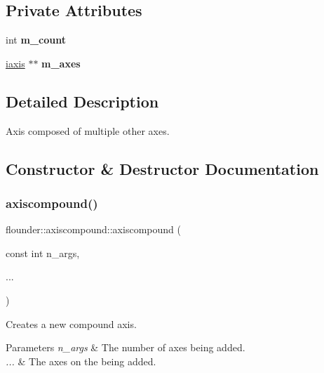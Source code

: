 \subsection*{Private Attributes}
\begin{DoxyCompactItemize}
\item 
\mbox{\label{classflounder_1_1axiscompound_ab876ccafbfabb22aac47b09ce4917b0c}} 
int {\bfseries m\+\_\+count}
\item 
\mbox{\label{classflounder_1_1axiscompound_a5bbc0ced9b75906a09ecfc327db4b42a}} 
\hyperlink{classflounder_1_1iaxis}{iaxis} $\ast$$\ast$ {\bfseries m\+\_\+axes}
\end{DoxyCompactItemize}


\subsection{Detailed Description}
Axis composed of multiple other axes. 



\subsection{Constructor \& Destructor Documentation}
\mbox{\label{classflounder_1_1axiscompound_a5f1704b50b966bca51730f7fecfc3728}} 
\subsubsection{\texorpdfstring{axiscompound()}{axiscompound()}}
{\footnotesize\ttfamily flounder\+::axiscompound\+::axiscompound (\begin{DoxyParamCaption}\item[{const int}]{n\+\_\+args,  }\item[{}]{... }\end{DoxyParamCaption})}



Creates a new compound axis. 


\begin{DoxyParams}{Parameters}
{\em n\+\_\+args} & The number of axes being added. \\
\hline
{\em ...} & The axes on the being added. \\
\hline
\end{DoxyParams}
\mbox{\label{classflounder_1_1axiscompound_ae6143bb6a584988c55aaa70545ffae91}} 
